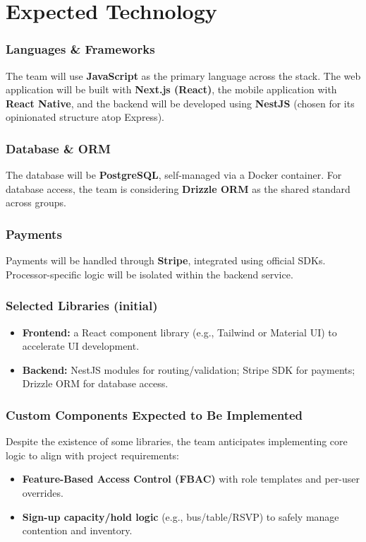 \documentclass{article}
\begin{document}
\section{Expected Technology}

\subsubsection*{Languages \& Frameworks} 
The team will use \textbf{JavaScript} as the primary language across the stack. 
The web application will be built with \textbf{Next.js (React)}, the mobile application with \textbf{React Native}, 
and the backend will be developed using \textbf{NestJS} (chosen for its opinionated structure atop Express).

\subsubsection*{Database \& ORM} 
The database will be \textbf{PostgreSQL}, self-managed via a Docker container. 
For database access, the team is considering \textbf{Drizzle ORM} as the shared standard across groups.

\subsubsection*{Payments} 
Payments will be handled through \textbf{Stripe}, integrated using official SDKs. 
Processor-specific logic will be isolated within the backend service.

\subsubsection*{Selected Libraries (initial)}
\begin{itemize}
  \item \textbf{Frontend:} a React component library (e.g., Tailwind or Material UI) to accelerate UI development.
  \item \textbf{Backend:} NestJS modules for routing/validation; Stripe SDK for payments; Drizzle ORM for database access.
\end{itemize}

\subsubsection*{Custom Components Expected to Be Implemented} 
Despite the existence of some libraries, the team anticipates implementing core logic to align with project requirements:
\begin{itemize}
  \item \textbf{Feature-Based Access Control (FBAC)} with role templates and per-user overrides.
  \item \textbf{Sign-up capacity/hold logic} (e.g., bus/table/RSVP) to safely manage contention and inventory.
\end{itemize}
\end{document}
